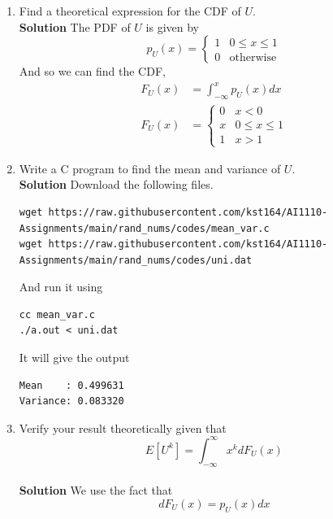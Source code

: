 \documentclass[journal, 12pt, twocolumn]{IEEEtran}
\begin{document}
\begin{enumerate}[label=\arabic{section}.\arabic*]
    \item
        Find a theoretical expression for the CDF of $U$.
        \\
        \textbf{Solution}
        The PDF of $U$ is given by
        \begin{equation}
            p_U(x) = 
            \begin{cases}
                1 & 0 \leq x \leq 1 \\
                0 & \text{otherwise}
            \end{cases} \label{eq:pu}
        \end{equation}
        And so we can find the CDF,
        \begin{align}
            F_U(x) &= \int_{-\infty}^{x}{p_U(x) dx} \\
            F_U(x) &=
            \begin{cases}
                0 & x < 0 \\
                x & 0 \leq x \leq 1 \\
                1 & x > 1
            \end{cases} \label{eq:fu}
        \end{align}

    \item
        Write a C program to find the mean and variance of $U$.
        \\
        \textbf{Solution} Download the following files.
        \begin{lstlisting}
wget https://raw.githubusercontent.com/kst164/AI1110-Assignments/main/rand_nums/codes/mean_var.c
wget https://raw.githubusercontent.com/kst164/AI1110-Assignments/main/rand_nums/codes/uni.dat
        \end{lstlisting}
        And run it using
        \begin{lstlisting}
cc mean_var.c
./a.out < uni.dat
        \end{lstlisting}
        It will give the output
        \begin{lstlisting}
Mean    : 0.499631
Variance: 0.083320
        \end{lstlisting}

    \item
        Verify your result theoretically given that
        \begin{equation}
            E\left[U^k\right] = \int_{-\infty}^{\infty}{x^k d F_U(x)}
        \end{equation}
        \\
        \textbf{Solution}
        We use the fact that
        \begin{equation}
            d F_U(x) = p_U(x) dx
        \end{equation}


\end{enumerate}
\end{document}
